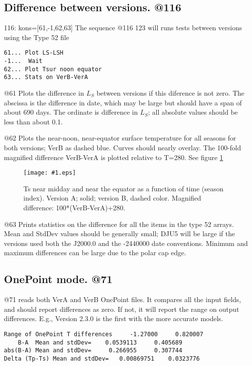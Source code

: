 \documentclass{article}  %
\newcommand{\igc}[1]{\texttt{[image: \#1.eps]}}
\begin{document}
\subsection{Difference between versions.  @116 \label{a116}} %
116: kons=[61,-1,62,63]  The sequence @116 123 will runs tests between versions using the Type 52 file
\vspace{-3.mm} 
\begin{verbatim}
61... Plot LS-LSH
-1...  Wait
62... Plot Tsur noon equator
63... Stats on VerB-VerA
\end{verbatim}
@61 Plots the difference in $L_S$ between versions if this diference is not zero. The abscissa is the difference in date, which may be large but should have a span of about 690 days. The ordinate is difference in $L_S$;  all absolute values should be less than about 0.1. 

@62 Plots the near-noon, near-equator surface temperature for all seasons for
both versions; VerB as dashed blue. Curves should nearly overlay. The 100-fold
magnified difference VerB-VerA is plotted relative to T=280. See figure
\ref{p62}

\begin{figure}[!ht] \igc{p62}
\caption[Seasonal Equator Noon] {Ts near midday and near the equator as a
  function of time (season index). Version A; solid; version B, dashed
  color. Magnified difference: 100*(VerB-VerA)+280.
\label{p62} } \end{figure}

@63 Prints statistics on the difference for all the items in the type 52
arrays. Mean and StdDev values should be generally small; DJU5 will be large if
the versions used both the J2000.0 and the -2440000 date conventions. Minimum
and maximum differences can be large due to the polar cap edge.

\subsection{OnePoint mode. @71}
 @71 reads both VerA and VerB OnePoint files. It compares all the input fields, and should report differences as zero. If not, it will report the range on output differences. E.g., Version 2.3.0 is the first with the more
accurate models.
\vspace{-3.mm} 
\begin{verbatim}
Range of OnePoint T differences     -1.27000     0.820007
    B-A  Mean and stdDev=    0.0539113     0.405689
abs(B-A) Mean and stdDev=     0.266955     0.307744
Delta (Tp-Ts) Mean and stdDev=   0.00869751    0.0323776
\end{verbatim}
\end{document}
